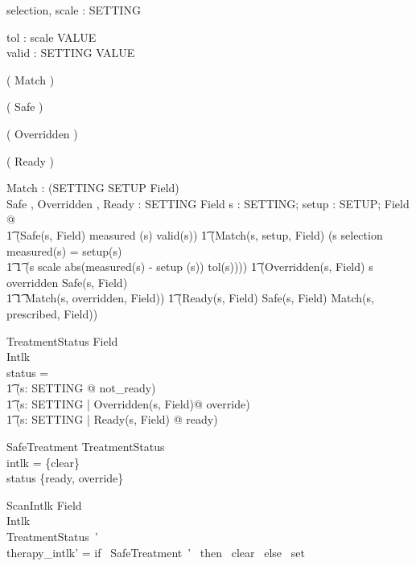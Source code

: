 \documentclass{llncs}
\begin{document}
\begin{axdef}
selection, scale : \power SETTING
\end{axdef}

\begin{axdef}
tol : scale \fun VALUE \\
valid : SETTING \fun \power VALUE
\end{axdef}

\begin{zed}
  \relation ( Match \varg )
\end{zed}

\begin{zed}
  \relation ( Safe \varg )
\end{zed}

\begin{zed}
  \relation ( Overridden \varg )
\end{zed}

\begin{zed}
  \relation ( Ready \varg )
\end{zed}

\begin{axdef}
Match \varg : \power(SETTING \cross SETUP \cross Field) \\
Safe \varg, Overridden \varg, Ready \varg : SETTING \rel Field 
\where \forall s : SETTING; setup : SETUP; Field @ \\
\t1 (Safe(s, \theta Field) \iff measured (s) \in valid(s)) \land
\also
\t1 (Match(s, setup, \theta Field) \iff (s \in selection \land
measured(s) = setup(s) \lor \\
\t1 \t1 (s \in scale \land abs(measured(s) - setup (s)) \leq
tol(s))))\land
\also
\t1 (Overridden(s, \theta Field) \iff s \in \dom overridden \land
Safe(s, \theta Field) \land \\
\t1 \t1 Match(s, overridden, \theta Field)) \land
\also
\t1 (Ready(s, \theta Field) \iff Safe(s, \theta Field) \land
Match(s, prescribed, \theta Field))
\end{axdef}

\begin{schema}{TreatmentStatus}
Field \\
Intlk \\
\where status = \\
\t1 (\lambda s: SETTING @ not\_ready) \oplus \\
\t1 (\lambda s: SETTING | Overridden(s, \theta Field)@ override)
\oplus \\
\t1 (\lambda s: SETTING | Ready(s, \theta Field) @ ready)
\end{schema}

\begin{schema}{SafeTreatment}
TreatmentStatus \\
\where \ran intlk = \{clear\} \\
\ran status \subseteq \{ready, override\}
\end{schema}

\begin{schema}{ScanIntlk}
\Xi Field \\
\Delta Intlk \\
\where TreatmentStatus~' \\
therapy\_intlk' = if \, SafeTreatment~' \, then \, clear \, else \, set
\end{schema}
\end{document}
